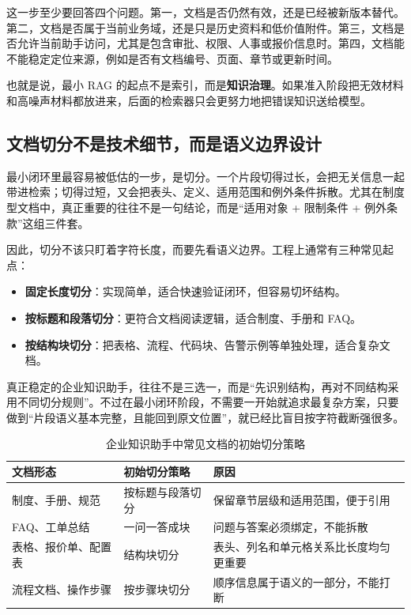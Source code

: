 这一步至少要回答四个问题。第一，文档是否仍然有效，还是已经被新版本替代。第二，文档是否属于当前业务域，还是只是历史资料和低价值附件。第三，文档是否允许当前助手访问，尤其是包含审批、权限、人事或报价信息时。第四，文档能不能稳定定位来源，例如是否有文档编号、页面、章节或更新时间。

也就是说，最小 RAG 的起点不是索引，而是\textbf{知识治理}。如果准入阶段把无效材料和高噪声材料都放进来，后面的检索器只会更努力地把错误知识送给模型。

\subsection{文档切分不是技术细节，而是语义边界设计}
最小闭环里最容易被低估的一步，是切分。一个片段切得过长，会把无关信息一起带进检索；切得过短，又会把表头、定义、适用范围和例外条件拆散。尤其在制度型文档中，真正重要的往往不是一句结论，而是“适用对象 + 限制条件 + 例外条款”这组三件套。

因此，切分不该只盯着字符长度，而要先看语义边界。工程上通常有三种常见起点：
\begin{itemize}
  \item \textbf{固定长度切分}：实现简单，适合快速验证闭环，但容易切坏结构。
  \item \textbf{按标题和段落切分}：更符合文档阅读逻辑，适合制度、手册和 FAQ。
  \item \textbf{按结构块切分}：把表格、流程、代码块、告警示例等单独处理，适合复杂文档。
\end{itemize}

真正稳定的企业知识助手，往往不是三选一，而是“先识别结构，再对不同结构采用不同切分规则”。不过在最小闭环阶段，不需要一开始就追求最复杂方案，只要做到“片段语义基本完整，且能回到原文位置”，就已经比盲目按字符截断强很多。

\begin{table}[H]
\centering
\small
\begin{tabularx}{\textwidth}{>{\raggedright\arraybackslash}p{2.8cm}>{\raggedright\arraybackslash}p{2.8cm}>{\raggedright\arraybackslash}X}
\toprule
\textbf{文档形态} & \textbf{初始切分策略} & \textbf{原因} \\
\midrule
制度、手册、规范 & 按标题与段落切分 & 保留章节层级和适用范围，便于引用 \\
FAQ、工单总结 & 一问一答成块 & 问题与答案必须绑定，不能拆散 \\
表格、报价单、配置表 & 结构块切分 & 表头、列名和单元格关系比长度均匀更重要 \\
流程文档、操作步骤 & 按步骤块切分 & 顺序信息属于语义的一部分，不能打断 \\
\bottomrule
\end{tabularx}
\caption{企业知识助手中常见文档的初始切分策略}
\label{tab:rag-chunking-start}
\end{table}

